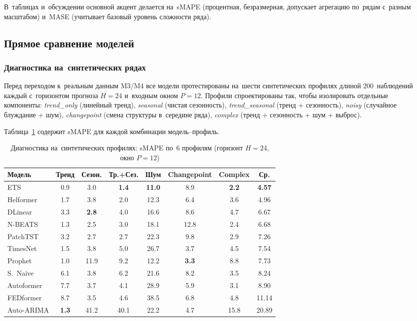 В~таблицах и~обсуждении основной акцент делается на~sMAPE
(процентная, безразмерная, допускает агрегацию по~рядам с~разным
масштабом) и~MASE (учитывает базовый уровень сложности ряда).

\subsection{Прямое сравнение моделей}
\label{subsec:direct}

\subsubsection{Диагностика на~синтетических рядах}
\label{sssec:synth}

Перед переходом к~реальным данным M3/M4 все модели протестированы
на~шести синтетических профилях длиной 200~наблюдений каждый
с~горизонтом прогноза $H{=}24$ и~входным окном $P{=}12$.
Профили спроектированы так, чтобы изолировать отдельные компоненты:
\textit{trend\_only} (линейный тренд),
\textit{seasonal} (чистая сезонность),
\textit{trend\_seasonal} (тренд + сезонность),
\textit{noisy} (случайное блуждание + шум),
\textit{changepoint} (смена структуры в~середине ряда),
\textit{complex} (тренд + сезонность + шум + выброс).

Таблица~\ref{tab:synth-smape} содержит sMAPE для каждой
комбинации модель--профиль.

\begin{table}[H]
\centering
\caption{Диагностика на~синтетических профилях: sMAPE по~6 профилям (горизонт $H{=}24$, окно $P{=}12$)}
\label{tab:synth-smape}
\footnotesize
\setlength{\tabcolsep}{3pt}
\begin{tabular}{@{}lcccccc|c@{}}
\toprule
Модель & Тренд & Сезон. & Тр.+Сез. & Шум & Changepoint & Complex & Ср. \\
\midrule
ETS            &  0.9 &  3.0 &  \textbf{1.4} & \textbf{11.0} &  8.9 &  \textbf{2.2} & \textbf{4.57} \\
Helformer      &  1.7 &  3.8 &  2.0 & 12.3 &  6.4 &  3.6 &  4.96 \\
DLinear        &  3.3 &  \textbf{2.8} &  4.0 & 16.6 &  8.6 &  4.7 &  6.67 \\
N-BEATS        &  1.3 &  2.5 &  3.0 & 18.1 & 12.8 &  2.4 &  6.68 \\
PatchTST       &  3.2 &  2.7 &  2.7 & 22.3 &  9.8 &  2.9 &  7.26 \\
TimesNet       &  1.5 &  3.8 &  5.0 & 26.7 &  3.7 &  4.5 &  7.54 \\
Prophet        &  1.0 & 11.9 &  9.2 & 12.2 &  \textbf{3.3} &  8.8 &  7.73 \\
S.~Naive       &  6.1 &  3.8 &  6.2 & 21.6 &  8.2 &  3.5 &  8.24 \\
Autoformer     &  7.7 &  3.7 &  4.1 & 28.9 &  5.9 &  3.1 &  8.90 \\
FEDformer      &  8.7 &  3.5 &  4.6 & 38.5 &  6.8 &  4.8 & 11.14 \\
Auto-ARIMA     &  \textbf{1.3} & 41.2 & 40.1 & 22.2 &  4.7 & 15.8 & 20.89 \\
\bottomrule
\end{tabular}
\end{table}

